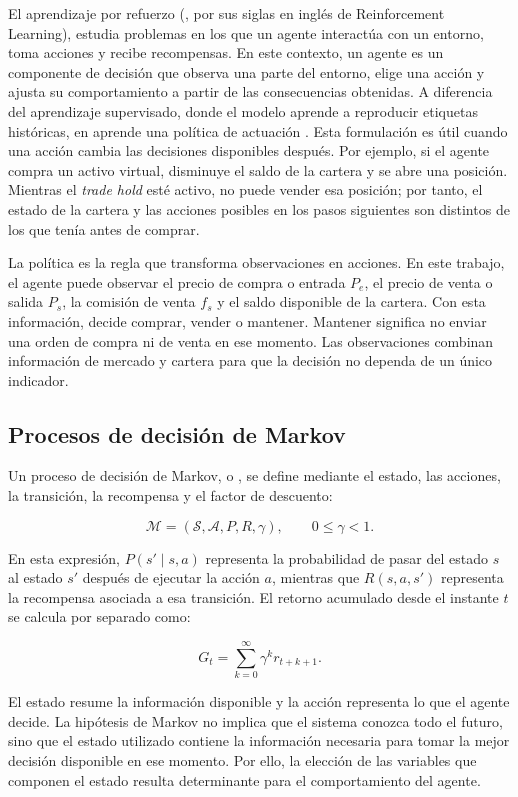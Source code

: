 El aprendizaje por refuerzo (, por sus siglas en inglés de Reinforcement Learning), estudia problemas en los que un agente interactúa con un entorno, toma acciones y recibe recompensas. En este contexto, un agente es un componente de decisión que observa una parte del entorno, elige una acción y ajusta su comportamiento a partir de las consecuencias obtenidas. A diferencia del aprendizaje supervisado, donde el modelo aprende a reproducir etiquetas históricas, en  aprende una política de actuación \cite{sutton2018reinforcement}. Esta formulación es útil cuando una acción cambia las decisiones disponibles después. Por ejemplo, si el agente compra un activo virtual, disminuye el saldo de la cartera y se abre una posición. Mientras el \textit{trade hold} esté activo, no puede vender esa posición; por tanto, el estado de la cartera y las acciones posibles en los pasos siguientes son distintos de los que tenía antes de comprar.

La política es la regla que transforma observaciones en acciones. En este trabajo, el agente puede observar el precio de compra o entrada $P_e$, el precio de venta o salida $P_s$, la comisión de venta $f_s$ y el saldo disponible de la cartera. Con esta información, decide comprar, vender o mantener. Mantener significa no enviar una orden de compra ni de venta en ese momento. Las observaciones combinan información de mercado y cartera para que la decisión no dependa de un único indicador.




\subsection{Procesos de decisión de Markov}

Un proceso de decisión de Markov, o , se define mediante el estado, las acciones, la transición, la recompensa y el factor de descuento:

\[
\mathcal{M}=(\mathcal{S},\mathcal{A},P,R,\gamma),
\qquad 0 \leq \gamma < 1.
\]

En esta expresión, $P(s'\mid s,a)$ representa la probabilidad de pasar del estado $s$ al estado $s'$ después de ejecutar la acción $a$, mientras que $R(s,a,s')$ representa la recompensa asociada a esa transición. El retorno acumulado desde el instante $t$ se calcula por separado como:

\[
G_t=\sum_{k=0}^{\infty}\gamma^k r_{t+k+1}.
\]

El estado resume la información disponible y la acción representa lo que el agente decide. La hipótesis de Markov no implica que el sistema conozca todo el futuro, sino que el estado utilizado contiene la información necesaria para tomar la mejor decisión disponible en ese momento. Por ello, la elección de las variables que componen el estado resulta determinante para el comportamiento del agente.

